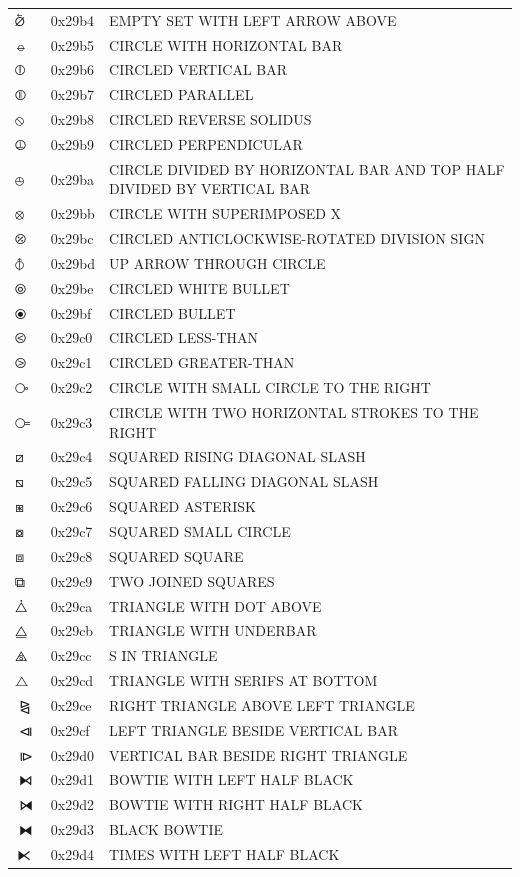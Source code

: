 \documentclass[12pt, twoside]{article}
\begin{document}
\begin{longtable}{L{1.0cm} L{2.0cm} >{\footnotesize}L{10cm}}
$⦴$&0x29b4&EMPTY SET WITH LEFT ARROW ABOVE\\
$⦵$&0x29b5&CIRCLE WITH HORIZONTAL BAR\\
$⦶$&0x29b6&CIRCLED VERTICAL BAR\\
$⦷$&0x29b7&CIRCLED PARALLEL\\
$⦸$&0x29b8&CIRCLED REVERSE SOLIDUS\\
$⦹$&0x29b9&CIRCLED PERPENDICULAR\\
$⦺$&0x29ba&CIRCLE DIVIDED BY HORIZONTAL BAR AND TOP HALF DIVIDED BY VERTICAL BAR\\
$⦻$&0x29bb&CIRCLE WITH SUPERIMPOSED X\\
$⦼$&0x29bc&CIRCLED ANTICLOCKWISE-ROTATED DIVISION SIGN\\
$⦽$&0x29bd&UP ARROW THROUGH CIRCLE\\
$⦾$&0x29be&CIRCLED WHITE BULLET\\
$⦿$&0x29bf&CIRCLED BULLET\\
$⧀$&0x29c0&CIRCLED LESS-THAN\\
$⧁$&0x29c1&CIRCLED GREATER-THAN\\
$⧂$&0x29c2&CIRCLE WITH SMALL CIRCLE TO THE RIGHT\\
$⧃$&0x29c3&CIRCLE WITH TWO HORIZONTAL STROKES TO THE RIGHT\\
$⧄$&0x29c4&SQUARED RISING DIAGONAL SLASH\\
$⧅$&0x29c5&SQUARED FALLING DIAGONAL SLASH\\
$⧆$&0x29c6&SQUARED ASTERISK\\
$⧇$&0x29c7&SQUARED SMALL CIRCLE\\
$⧈$&0x29c8&SQUARED SQUARE\\
$⧉$&0x29c9&TWO JOINED SQUARES\\
$⧊$&0x29ca&TRIANGLE WITH DOT ABOVE\\
$⧋$&0x29cb&TRIANGLE WITH UNDERBAR\\
$⧌$&0x29cc&S IN TRIANGLE\\
$⧍$&0x29cd&TRIANGLE WITH SERIFS AT BOTTOM\\
$⧎$&0x29ce&RIGHT TRIANGLE ABOVE LEFT TRIANGLE\\
$⧏$&0x29cf&LEFT TRIANGLE BESIDE VERTICAL BAR\\
$⧐$&0x29d0&VERTICAL BAR BESIDE RIGHT TRIANGLE\\
$⧑$&0x29d1&BOWTIE WITH LEFT HALF BLACK\\
$⧒$&0x29d2&BOWTIE WITH RIGHT HALF BLACK\\
$⧓$&0x29d3&BLACK BOWTIE\\
$⧔$&0x29d4&TIMES WITH LEFT HALF BLACK\\

\end{longtable}
\end{document}
